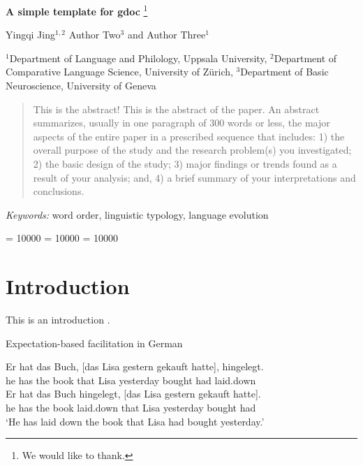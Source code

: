 \documentclass[
]{article}
\providecommand{\keywords}[1]
{\small \textit{Keywords:} #1
}
\begin{document}
\thispagestyle{empty}

\begin{center}
{\doublespacing
{\Large\sffamily\bfseries{A simple template for gdoc}}
\renewcommand*{\thefootnote}{\fnsymbol{footnote}}
\footnote{We would like to thank.}


Yingqi Jing\(^{1,2}\)
Author Two\(^3\) and Author Three\(^1\)

}
{\vspace{\baselineskip}\small \(^1\)Department of Language and Philology, Uppsala University, \(^2\)Department of Comparative Language Science, University of Zürich, \(^3\)Department of Basic Neuroscience, University of Geneva}

\end{center}
\vspace{6pt}


\setcounter{footnote}{0}

\newpage
\begin{abstract}
This is the abstract! This is the abstract of the paper. An abstract
summarizes, usually in one paragraph of 300 words or less, the major
aspects of the entire paper in a prescribed sequence that includes: 1)
the overall purpose of the study and the research problem(s) you
investigated; 2) the basic design of the study; 3) major findings or
trends found as a result of your analysis; and, 4) a brief summary of
your interpretations and conclusions.
\end{abstract}

\setlength\parindent{24pt} \keywords{word order, linguistic typology, language evolution}



\setlength{\parskip}{4pt} \renewcommand{\labelitemi}{-} \clubpenalty =
10000 \widowpenalty = 10000 \displaywidowpenalty = 10000

\let\eachwordone=\itshape
\let\eachwordtwo=\small
\def\gltoffset{0.5ex}

\section{Introduction}\label{introduction}

This is an introduction \autocite{Kemmerer2012}.

\begin{exe} \ex Expectation-based facilitation in German \label{ex-german}
\begin{xlist}
\ex \gll Er hat das Buch, [das Lisa gestern gekauft hatte], hingelegt.\\
         he has the book that Lisa yesterday bought had laid.down\\
\ex  \gll Er hat das Buch hingelegt, [das Lisa gestern gekauft hatte].\\
        he has the book laid.down that Lisa yesterday bought had\\
       \glt ‘He has laid down the book that Lisa had bought yesterday.’ 
\end{xlist}
\end{exe}
\end{document}
